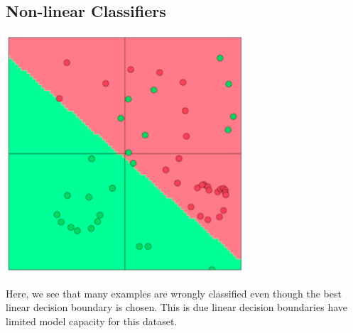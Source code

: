 \documentclass{tufte-handout}
\begin{document}
\subsection{Non-linear Classifiers}

\begin{marginfigure}%
  \includegraphics[width = \linewidth]{LinearBoundary2}
  \caption{Here, we see that many examples are wrongly classified even though the best linear decision boundary is chosen. This is due linear decision boundaries have limited model capacity for this dataset.}
    \label{fig:LinearBoundary2}
\end{marginfigure}
\end{document}
